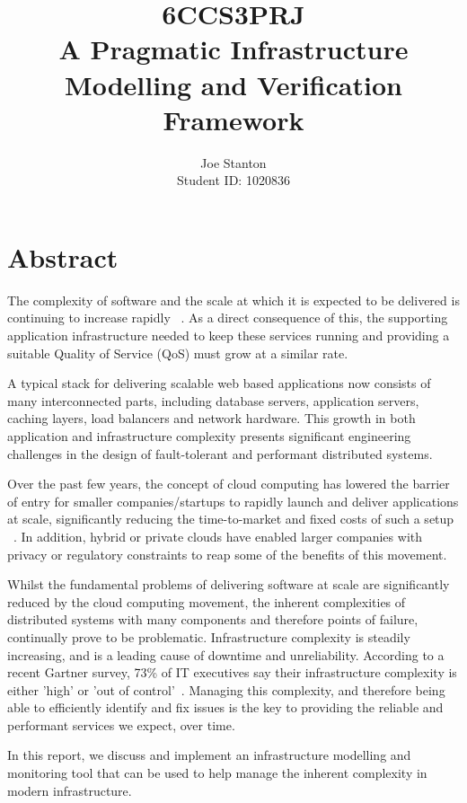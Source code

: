 \documentclass{cshonours}
\title{6CCS3PRJ \\\vspace{0.5cm}
  A Pragmatic Infrastructure Modelling and Verification Framework}
\author{Joe Stanton\\\vspace{0.5cm}
  Student ID: 1020836
}
\begin{document}
\maketitle

\chapter*{Abstract}
The complexity of software and the scale at which it is expected to be delivered is continuing to increase rapidly ~\cite{SoftwareComplexity}.
As a direct consequence of this, the supporting application infrastructure needed to keep these services running and providing a suitable Quality of Service (QoS) must grow at a similar rate.

A typical stack for delivering scalable web based applications now consists of many interconnected parts, including database servers, application servers, caching layers, load balancers and network hardware.
This growth in both application and infrastructure complexity presents significant engineering challenges in the design of fault-tolerant and performant distributed systems.

Over the past few years, the concept of cloud computing has lowered the barrier of entry for smaller companies/startups to rapidly launch and deliver applications at scale, significantly reducing the time-to-market and fixed costs of such a setup ~\cite{CloudComputing}.
In addition, hybrid or private clouds have enabled larger companies with privacy or regulatory constraints to reap some of the benefits of this movement.

Whilst the fundamental problems of delivering software at scale are significantly reduced by the cloud computing movement, the inherent complexities of distributed systems with many components and therefore points of failure, continually prove to be problematic. Infrastructure complexity is steadily increasing, and is a leading cause of downtime and unreliability. According to a recent Gartner survey, 73\% of IT executives say their infrastructure complexity is either 'high' or 'out of control’~\cite{Gartner2013}. Managing this complexity, and therefore being able to efficiently identify and fix issues is the key to providing the reliable and performant services we expect, over time.

In this report, we discuss and implement an infrastructure modelling and monitoring tool that can be used to help manage the inherent complexity in modern infrastructure.
\end{document}
